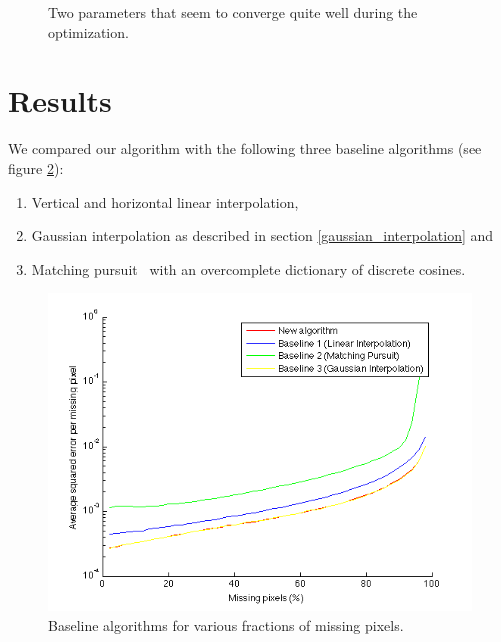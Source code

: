\documentclass[10pt,conference,compsocconf]{IEEEtran}
\begin{document}
\begin{figure}
  \centering
  \caption{Two parameters that seem to converge quite well during the optimization.}
  \label{gradient_descent_parameters}
\end{figure}

\section{Results}
We compared our algorithm with the following three baseline algorithms (see figure \ref{baseline_algorithms}):
\begin{enumerate}
\item Vertical and horizontal linear interpolation,
\item Gaussian interpolation as described in section \ref{gaussian_interpolation} and
\item Matching pursuit~\cite{matchingpursuit93} with an overcomplete dictionary of discrete cosines.
\end{enumerate}

\begin{figure}
\centering
\includegraphics[width=\columnwidth]{images/missingpixelsVsError.png}
\caption{Baseline algorithms for various fractions of missing pixels.}
\label{baseline_algorithms}
\end{figure}
 
\end{document}
